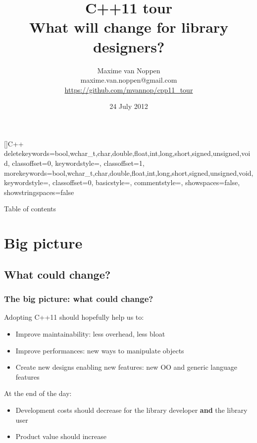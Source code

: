 \documentclass[xcolor=dvipsnames]{beamer}
\title[C++11 tour\hspace{25mm} \insertframenumber/\inserttotalframenumber]{C++11 tour\\What will change for library designers?}
\author[Maxime van Noppen]{Maxime van Noppen\\maxime.van.noppen@gmail.com\\\url{https://github.com/mvannop/cpp11_tour}}
\date{24 July 2012}
\begin{document}

[]{C++}%
  {
    deletekeywords={bool,wchar_t,char,double,float,int,long,short,signed,unsigned,void},
    classoffset=0,
    keywordstyle=\color{orange},
    classoffset=1,
    morekeywords={bool,wchar_t,char,double,float,int,long,short,signed,unsigned,void},
    keywordstyle=\color{blue},
    classoffset=0,
    basicstyle=\footnotesize\ttfamily,
    commentstyle=\color{red},
    showspaces=false,
    showstringspaces=false
  }%



\begin{frame}
\titlepage
\end{frame}

\begin{frame}{Table of contents}
\tableofcontents
\end{frame}

\section{Big picture}
\subsection{What could change?}
\begin{frame}
\frametitle{The big picture: what could change?}

Adopting C++11 should hopefully help us to:

\begin{itemize}
  \item Improve maintainability: less overhead, less bloat
  \pause
  \item Improve performances: new ways to manipulate objects
  \pause
  \item Create new designs enabling new features: new OO and generic language features
\end{itemize}

\pause
At the end of the day:
\begin{itemize}
  \item Development costs should decrease for the library developer \textbf{and} the library user
  \pause
  \item Product value should increase
\end{itemize}
\end{frame}
\end{document}
